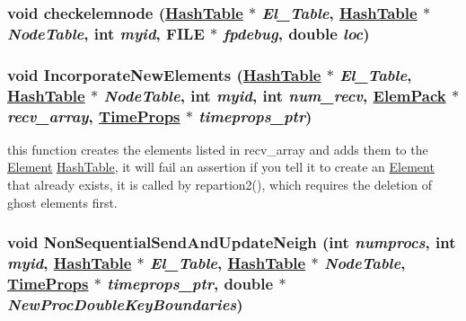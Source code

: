 \hypertarget{repartition__BSFC_8C_a17}{
\subsubsection[checkelemnode]{\setlength{\rightskip}{0pt plus 5cm}void checkelemnode (\hyperlink{classHashTable}{Hash\-Table} $\ast$ {\em El\_\-Table}, \hyperlink{classHashTable}{Hash\-Table} $\ast$ {\em Node\-Table}, int {\em myid}, FILE $\ast$ {\em fpdebug}, double {\em loc})}}
\label{repartition__BSFC_8C_a17}


\hypertarget{repartition__BSFC_8C_a18}{
\subsubsection[IncorporateNewElements]{\setlength{\rightskip}{0pt plus 5cm}void Incorporate\-New\-Elements (\hyperlink{classHashTable}{Hash\-Table} $\ast$ {\em El\_\-Table}, \hyperlink{classHashTable}{Hash\-Table} $\ast$ {\em Node\-Table}, int {\em myid}, int {\em num\_\-recv}, \hyperlink{structElemPack}{Elem\-Pack} $\ast$ {\em recv\_\-array}, \hyperlink{structTimeProps}{Time\-Props} $\ast$ {\em timeprops\_\-ptr})}}
\label{repartition__BSFC_8C_a18}


this function creates the elements listed in recv\_\-array and adds them to the \hyperlink{classElement}{Element} \hyperlink{classHashTable}{Hash\-Table}, it will fail an assertion if you tell it to create an \hyperlink{classElement}{Element} that already exists, it is called by repartion2(), which requires the deletion of ghost elements first. 

\hypertarget{repartition__BSFC_8C_a11}{
\subsubsection[NonSequentialSendAndUpdateNeigh]{\setlength{\rightskip}{0pt plus 5cm}void Non\-Sequential\-Send\-And\-Update\-Neigh (int {\em numprocs}, int {\em myid}, \hyperlink{classHashTable}{Hash\-Table} $\ast$ {\em El\_\-Table}, \hyperlink{classHashTable}{Hash\-Table} $\ast$ {\em Node\-Table}, \hyperlink{structTimeProps}{Time\-Props} $\ast$ {\em timeprops\_\-ptr}, double $\ast$ {\em New\-Proc\-Double\-Key\-Boundaries})}}
\label{repartition__BSFC_8C_a11}


